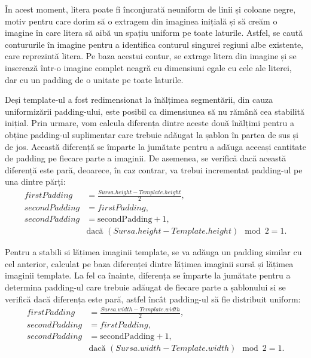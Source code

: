 \documentclass[a4paper,12pt]{report}
\begin{document}
În acest moment, litera poate fi înconjurată neuniform de linii și coloane negre, motiv pentru care dorim să o extragem din imaginea inițială și să creăm o imagine în care litera să aibă un spațiu uniform pe toate laturile. Astfel, se caută contururile în imagine pentru a identifica conturul singurei regiuni albe existente, care reprezintă litera. Pe baza acestui contur, se extrage litera din imagine și se inserează într-o imagine complet neagră cu dimensiuni egale cu cele ale literei, dar cu un padding de o unitate pe toate laturile.

Deși template-ul a fost redimensionat la înălțimea segmentării, din cauza uniformizării padding-ului, este posibil ca dimensiunea să nu rămână cea stabilită inițial. Prin urmare, vom calcula diferența dintre aceste două înălțimi pentru a obține padding-ul suplimentar care trebuie adăugat la șablon în partea de sus și de jos. Această diferență se împarte la jumătate pentru a adăuga aceeași cantitate de padding pe fiecare parte a imaginii. De asemenea, se verifică dacă această diferență este pară, deoarece, în caz contrar, va trebui incrementat padding-ul pe una dintre părți:
\[
    \begin{aligned}
        firstPadding  & = \frac{Sursa.height - Template.height}{2},               \\
        secondPadding & = firstPadding,                                           \\
        secondPadding & = \text{secondPadding} + 1,                               \\
                      & \text{dacă } (Sursa.height - Template.height) \mod 2 = 1.
    \end{aligned}
\]

Pentru a stabili si lățimea imaginii template, se va adăuga un padding similar cu cel anterior, calculat pe baza diferenței dintre lățimea imaginii sursă și lățimea imaginii template. La fel ca înainte, diferența se împarte la jumătate pentru a determina padding-ul care trebuie adăugat de fiecare parte a șablonului si se verifică dacă diferența este pară, astfel încât padding-ul să fie distribuit uniform:
\[
    \begin{aligned}
        firstPadding  & = \frac{Sursa.width - Template.width}{2},               \\
        secondPadding & = firstPadding,                                         \\
        secondPadding & = \text{secondPadding} + 1,                             \\
                      & \text{dacă } (Sursa.width - Template.width) \mod 2 = 1.
    \end{aligned}
\]
\end{document}
